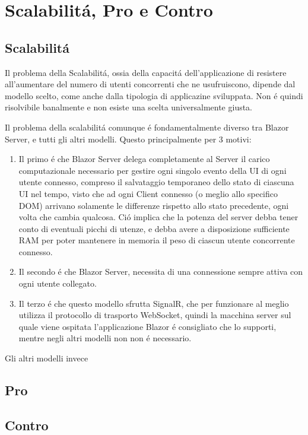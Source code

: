 \chapter{Scalabilit\'a, Pro e Contro}\label{cap:scalprocont}
\section{Scalabilit\'a}\label{sez:scalabilita}
Il problema della Scalabilit\'a, ossia della capacit\'a dell'applicazione di resistere all'aumentare del numero di utenti concorrenti che ne usufruiscono, dipende dal modello scelto, come anche dalla tipologia di applicazine sviluppata.
Non \'e quindi risolvibile banalmente e non esiste una scelta universalmente giusta.

Il problema della scalabilit\'a comunque \'e fondamentalmente diverso tra Blazor Server, e tutti gli altri modelli.
Questo principalmente per 3 motivi:
\begin{enumerate}
	\item Il primo \'e che Blazor Server delega completamente al Server il carico computazionale necessario per gestire ogni singolo evento della UI di ogni utente connesso, compreso il salvataggio temporaneo dello stato di ciascuna UI nel tempo, visto che ad ogni Client connesso (o meglio allo specifico DOM) arrivano solamente le differenze rispetto allo stato precedente, ogni volta che cambia qualcosa.
	Ci\'o implica che la potenza del server debba tener conto di eventuali picchi di utenze, e debba avere a disposizione sufficiente RAM per poter mantenere in memoria il peso di ciascun utente concorrente connesso.
	
	\item Il secondo \'e che Blazor Server, necessita di una connessione sempre attiva con ogni utente collegato.
	
	\item Il terzo \'e che questo modello sfrutta SignalR, che per funzionare al meglio utilizza il protocollo di trasporto WebSocket, quindi la macchina server sul quale viene ospitata l'applicazione Blazor \'e consigliato che lo supporti, mentre negli altri modelli non non \'e necessario.
\end{enumerate}

Gli altri modelli invece

\section{Pro}\label{sez:pro}


\section{Contro}\label{sez:contro}